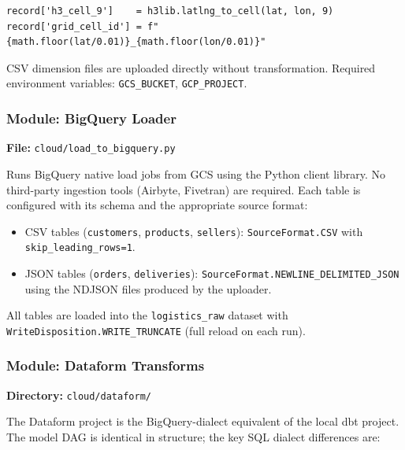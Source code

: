 \begin{verbatim}
record['h3_cell_9']    = h3lib.latlng_to_cell(lat, lon, 9)
record['grid_cell_id'] = f"{math.floor(lat/0.01)}_{math.floor(lon/0.01)}"
\end{verbatim}

CSV dimension files are uploaded directly without transformation.
Required environment variables: \texttt{GCS\_BUCKET}, \texttt{GCP\_PROJECT}.

\subsubsection{Module: BigQuery Loader}
\label{sec:bq_loader}

\textbf{File:} \texttt{cloud/load\_to\_bigquery.py}

Runs BigQuery native load jobs from GCS using the Python client library. No third-party
ingestion tools (Airbyte, Fivetran) are required. Each table is configured with its
schema and the appropriate source format:

\begin{itemize}
  \item CSV tables (\texttt{customers}, \texttt{products}, \texttt{sellers}):
        \texttt{SourceFormat.CSV} with \texttt{skip\_leading\_rows=1}.
  \item JSON tables (\texttt{orders}, \texttt{deliveries}):
        \texttt{SourceFormat.NEWLINE\_DELIMITED\_JSON} using the NDJSON files
        produced by the uploader.
\end{itemize}

All tables are loaded into the \texttt{logistics\_raw} dataset with
\texttt{WriteDisposition.WRITE\_TRUNCATE} (full reload on each run).

\subsubsection{Module: Dataform Transforms}
\label{sec:dataform}

\textbf{Directory:} \texttt{cloud/dataform/}

The Dataform project is the BigQuery-dialect equivalent of the local dbt project.
The model DAG is identical in structure; the key SQL dialect differences are:

